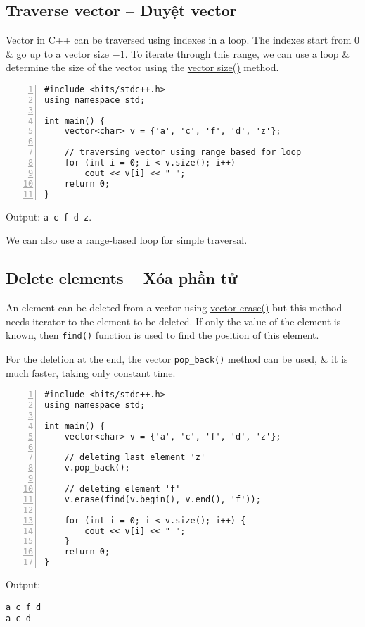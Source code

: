 \documentclass{article}
\begin{document}

\subsection{Traverse vector -- Duyệt vector}
Vector in C++ can be traversed using indexes in a loop. The indexes start from 0 \& go up to a vector size $- 1$. To iterate through this range, we can use a loop \& determine the size of the vector using the \href{https://www.geeksforgeeks.org/vectorempty-vectorsize-c-stl/}{vector size()} method.
\begin{Verbatim}[numbers=left,xleftmargin=5mm]
#include <bits/stdc++.h>
using namespace std;

int main() {
    vector<char> v = {'a', 'c', 'f', 'd', 'z'};
	
    // traversing vector using range based for loop
    for (int i = 0; i < v.size(); i++)
        cout << v[i] << " ";
    return 0;
}
\end{Verbatim}
Output: {\tt a c f d z}.

We can also use a range-based loop for simple traversal.


\subsection{Delete elements -- Xóa phần tử}
An element can be deleted from a vector using \href{https://www.geeksforgeeks.org/vector-erase-and-clear-in-cpp/}{vector erase()} but this method needs iterator to the element to be deleted. If only the value of the element is known, then {\tt find()} function is used to find the position of this element.

For the deletion at the end, the \href{https://www.geeksforgeeks.org/vector-pop-back-in-cpp-stl/}{vector {\tt pop\_back()}} method can be used, \& it is much faster, taking only constant time.
\begin{Verbatim}[numbers=left,xleftmargin=5mm]
#include <bits/stdc++.h>
using namespace std;

int main() {
    vector<char> v = {'a', 'c', 'f', 'd', 'z'};
	
    // deleting last element 'z'
    v.pop_back();
	
    // deleting element 'f'
    v.erase(find(v.begin(), v.end(), 'f'));
	
    for (int i = 0; i < v.size(); i++) {
        cout << v[i] << " ";
    }
    return 0;
}
\end{Verbatim}
Output:
\begin{verbatim}
a c f d 
a c d
\end{verbatim}
\end{document}
